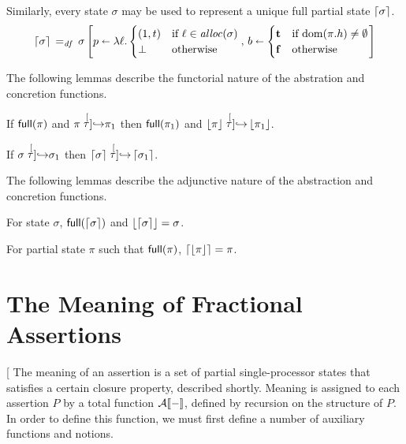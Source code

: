 \documentclass[11pt]{report}
\begin{document}
Similarly, every state $\sigma$ may be used to represent a unique full partial state $\left\lceil\sigma\right\rceil$. \begin{equation}
	\left\lceil\sigma\right\rceil \operatorname{\;=_{\mathit{df}}\;} \sigma \left[ p \shortleftarrow \lambda \ell . \begin{cases}
		(1,t) & \text{if $\ell \in \mathit{alloc}(\sigma)$} \\
		\bot & \text{otherwise}
	\end{cases},\, b \shortleftarrow \begin{cases}
		\mathbf{t} & \text{if $\operatorname{\mathrm{dom}}(\pi.h) \neq \operatorname{\emptyset}$} \\
		\mathbf{f} & \text{otherwise}
	\end{cases} \right]
\end{equation}

The following lemmas describe the functorial nature of the abstration and concretion functions. 

\begin{lemma}
	\label{lem:concst-tau}
	If $\mathsf{full}(\pi)$ and $\pi \stackrel[\tau]{}{\operatorname{\hookrightarrow}} \pi_1$ then $\mathsf{full}(\pi_1)$ and $\left\lfloor\pi\right\rfloor \stackrel[\tau]{}{\operatorname{\hookrightarrow}} \left\lfloor\pi_1\right\rfloor$. 
\end{lemma}

\begin{lemma}
	\label{lem:abst-tau}
	If $\sigma \stackrel[\tau]{}{\operatorname{\hookrightarrow}} \sigma_1$ then $\left\lceil\sigma\right\rceil \stackrel[\tau]{}{\operatorname{\hookrightarrow}} \left\lceil\sigma_1\right\rceil$. 
\end{lemma}

The following lemmas describe the adjunctive nature of the abstraction and concretion functions.

\begin{lemma}
	\label{lem:concst-abst}
	For state $\sigma$, $\mathsf{full}(\left\lceil\sigma\right\rceil)$ and $\left\lfloor\left\lceil\sigma\right\rceil\right\rfloor = \sigma$. 
\end{lemma}

\begin{lemma}
	\label{lem:abst-concst}
	For partial state $\pi$ such that $\mathsf{full}(\pi)$, $\left\lceil\left\lfloor\pi\right\rfloor\right\rceil = \pi$.
\end{lemma}


\section{The Meaning of Fractional Assertions} %
\label{sec:permission-assertion-semantics}
[
The meaning of an assertion is a set of partial single-processor states that satisfies a certain closure property, described shortly. Meaning is assigned to each assertion $P$ by a total function $\mathcal{A}[\![-]\!]$, defined by recursion on the structure of $P$. In order to define this function, we must first define a number of auxiliary functions and notions.
\end{document}
